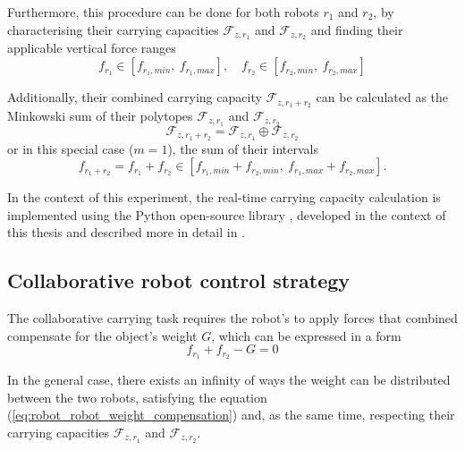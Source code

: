 Furthermore, this procedure can be done for both robots $r_1$ and $r_2$, by characterising their carrying capacities
 $\mathcal{F}_{z,r_1}$ and $\mathcal{F}_{z,r_2}$ and finding their applicable vertical force ranges 
\begin{equation}
    f_{r_1} \in [f_{r_1,min}, ~f_{r_1,max} ], \quad f_{r_2}\in [f_{r_2,min}, ~f_{r_2,max}]
    \label{eq:robot_robot_carrying_capacity}
\end{equation}
 
Additionally, their combined carrying capacity $\mathcal{F}_{z,r_1+r_2}$ can be calculated as the Minkowski sum of their polytopes $\mathcal{F}_{z,r_1}$ and $\mathcal{F}_{z,r_2}$ 
$$\mathcal{F}_{z,r_1+r_2} = \mathcal{F}_{z,r_1}\oplus \mathcal{F}_{z,r_2}$$
or in this special case ($m=1$), the sum of their intervals 
$$f_{r_1+r_2} = f_{r_1}+f_{r_2} \in  [f_{r_1,min} + f_{r_2,min}, ~f_{r_1,max} + f_{r_2,max}].$$

In the context of this experiment, the real-time carrying capacity calculation is implemented using the Python open-source library , developed in the context of this thesis and described more in detail in .

\subsection{Collaborative robot control strategy}
\label{sec:collab_robot_control_double_robot}
The collaborative carrying task requires the robot's to apply forces that combined compensate for the object's weight $G$, which can be expressed in a form
\begin{equation}
    f_{r_1} + f_{r_2} - G = 0
    \label{eq:robot_robot_weight_compensation}
\end{equation}

In the general case, there exists an infinity of ways the weight can be distributed between the two robots, satisfying the equation (\ref{eq:robot_robot_weight_compensation}) and, as the same time, respecting their carrying capacities $\mathcal{F}_{z,r_1}$ and $\mathcal{F}_{z,r_2}$.

